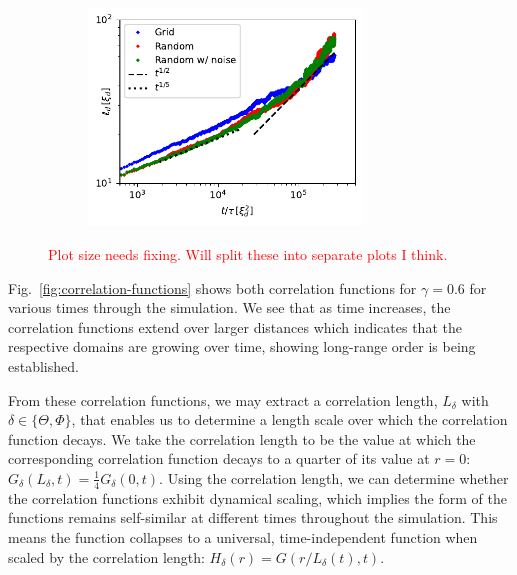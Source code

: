 \begin{figure}
\begin{subfigure}{0.5\textwidth}
        \centering
        \includegraphics[height=0.8\textwidth,width=0.8\textwidth]{
            gfx/ch-twoCompDynamics/scalar_vortex.pdf}
        \caption{\label{fig:scalar-vortex-lengths}}
    \end{subfigure}
    \caption{\textcolor{red}{Plot size needs fixing. Will split these into
            separate plots I think.}}
\end{figure}
Fig.~\ref{fig:correlation-functions} shows both correlation functions for
\(\gamma=0.6\) for various times through the simulation.
We see that as time increases, the correlation functions extend over larger
distances which indicates that the respective domains are growing over time,
showing long-range order is being established.

From these correlation functions, we may extract a correlation length,
\(L_\delta \) with \(\delta \in \{\Theta, \Phi \} \), that enables us to
determine a length scale over which the correlation function decays.
We take the correlation length to be the value at which the corresponding
correlation function decays to a quarter of its value at
\(r=0\): \(G_\delta(L_\delta, t) = \frac{1}{4}G_\delta(0, t)\).
Using the correlation length, we can determine whether the correlation functions
exhibit dynamical scaling, which implies the form of the functions remains
self-similar at different times throughout the simulation.
This means the function collapses to a universal, time-independent function
when scaled by the correlation length: \(H_\delta(r) = G(r/L_\delta(t), t)\).


